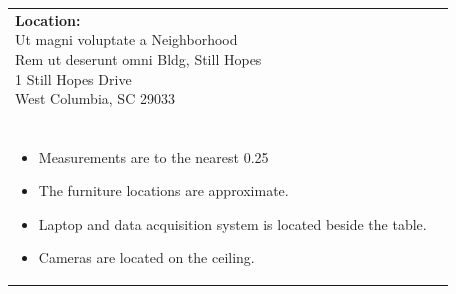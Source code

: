 \documentclass[12pt]{article}
\begin{document}
    \vspace*{\fill}  %
    \begin{table}[H]
	\begin{tabular}{l l}
		\makecell[lt]{
			\textbf{Location:}\\
     		Ut magni voluptate a Neighborhood \\
 		    Rem ut deserunt omni Bldg, Still Hopes\\
           	1 Still Hopes Drive\\
           	West Columbia, SC 29033\\\\
        }   	
        &	
		\makecell[tp{5in}]{
		\textbf{Notes:}\\
		\vspace{-8mm}  %
		\begin{itemize}
			\setlength\itemsep{-3mm}  %
			\item Measurements are to the nearest \SI{0.25}{\inch}
			\item The furniture locations are approximate.
			\item Laptop and data acquisition system is located beside the table.
			\item Cameras are located on the ceiling.
		\end{itemize}
		}	
			
	\end{tabular}
	\vspace{-8mm} %
\end{table}

    
\end{document}
